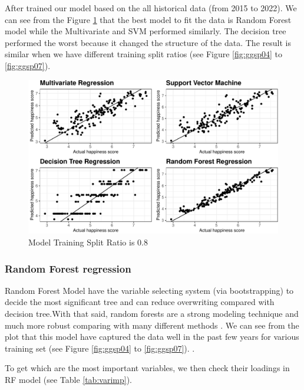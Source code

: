 \documentclass[11pt,a4paper,]{article}
\begin{document}
After trained our model based on the all historical data (from 2015 to 2022). We can see from the Figure \ref{fig:training} that the best model to fit the data is Random Forest model while the Multivariate and SVM performed similarly. The decision tree performed the worst because it changed the structure of the data. The result is similar when we have different training split ratios (see Figure \ref{fig:ggsp04} to \ref{fig:ggsp07}).

\newpage

\begin{figure}
\centering
\includegraphics{Assignment4_files/figure-latex/training-1.pdf}
\caption{\label{fig:training}Model Training Split Ratio is 0.8}
\end{figure}

\hypertarget{random-forest-regression}{%
\subsubsection{Random Forest regression}\label{random-forest-regression}}

Random Forest Model have the variable selecting system (via bootstrapping) to decide the most significant tree and can reduce overwriting compared with decision tree.With that said, random forests are a strong modeling technique and much more robust comparing with many different methods \autocite{liberman2017}. We can see from the plot that this model have captured the data well in the past few years for various training set (see Figure \ref{fig:ggsp04} to \ref{fig:ggsp07}). .

To get which are the most important variables, we then check their loadings in RF model (see Table \ref{tab:varimp}).
\end{document}
